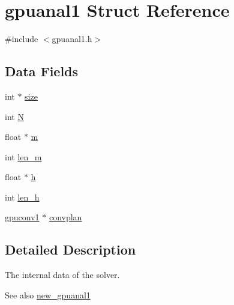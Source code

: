 \hypertarget{structgpuanal1}{
\section{gpuanal1 Struct Reference}
\label{structgpuanal1}
}


{\ttfamily \#include $<$gpuanal1.h$>$}

\subsection*{Data Fields}
\begin{DoxyCompactItemize}
\item 
int $\ast$ \hyperlink{structgpuanal1_ad147c43387b95d5f71952a5e0fdb46ff}{size}
\item 
int \hyperlink{structgpuanal1_a91ed47f0624ec72ff8fba6f108377448}{N}
\item 
float $\ast$ \hyperlink{structgpuanal1_a9425e77d84a9acd14a849f55f569d2b1}{m}
\item 
int \hyperlink{structgpuanal1_a28ea93a34f398e8d08743e4f5eb9ea3c}{len\_\-m}
\item 
float $\ast$ \hyperlink{structgpuanal1_aa887b955569cf40b8fdedeb7b1f32ffc}{h}
\item 
int \hyperlink{structgpuanal1_a092694a3871a8403ec1839bc2c927598}{len\_\-h}
\item 
\hyperlink{structgpuconv1}{gpuconv1} $\ast$ \hyperlink{structgpuanal1_adfdf6952b216529554c65f151edcc55c}{convplan}
\end{DoxyCompactItemize}


\subsection{Detailed Description}
The internal data of the solver. \begin{DoxySeeAlso}{See also}
\hyperlink{gpuanal1_8h_a635a155a39748764eeaeba18dd27efa1}{new\_\-gpuanal1} 
\end{DoxySeeAlso}


